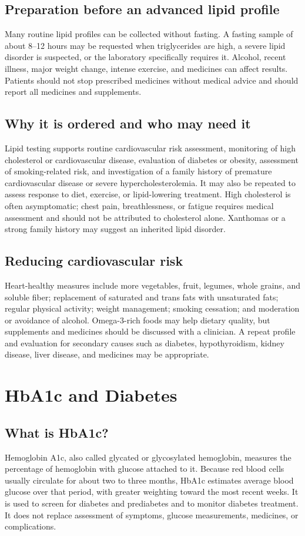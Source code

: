 \documentclass[11pt,openany]{book}
\begin{document}
\subsection*{Preparation before an advanced lipid profile}
Many routine lipid profiles can be collected without fasting. A fasting sample
of about 8--12 hours may be requested when triglycerides are high, a severe
lipid disorder is suspected, or the laboratory specifically requires it.
Alcohol, recent illness, major weight change, intense exercise, and medicines
can affect results. Patients should not stop prescribed medicines without
medical advice and should report all medicines and supplements.

\subsection*{Why it is ordered and who may need it}
Lipid testing supports routine cardiovascular risk assessment, monitoring of
high cholesterol or cardiovascular disease, evaluation of diabetes or obesity,
assessment of smoking-related risk, and investigation of a family history of
premature cardiovascular disease or severe hypercholesterolemia. It may also
be repeated to assess response to diet, exercise, or lipid-lowering treatment.
High cholesterol is often asymptomatic; chest pain, breathlessness, or fatigue
requires medical assessment and should not be attributed to cholesterol alone.
Xanthomas or a strong family history may suggest an inherited lipid disorder.

\subsection*{Reducing cardiovascular risk}
Heart-healthy measures include more vegetables, fruit, legumes, whole grains,
and soluble fiber; replacement of saturated and trans fats with unsaturated
fats; regular physical activity; weight management; smoking cessation; and
moderation or avoidance of alcohol. Omega-3-rich foods may help dietary quality,
but supplements and medicines should be discussed with a clinician. A repeat
profile and evaluation for secondary causes such as diabetes, hypothyroidism,
kidney disease, liver disease, and medicines may be appropriate.

\section{HbA1c and Diabetes}

\subsection*{What is HbA1c?}
Hemoglobin A1c, also called glycated or glycosylated hemoglobin, measures the
percentage of hemoglobin with glucose attached to it. Because red blood cells
usually circulate for about two to three months, HbA1c estimates average blood
glucose over that period, with greater weighting toward the most recent weeks.
It is used to screen for diabetes and prediabetes and to monitor diabetes
treatment. It does not replace assessment of symptoms, glucose measurements,
medicines, or complications.
\end{document}
